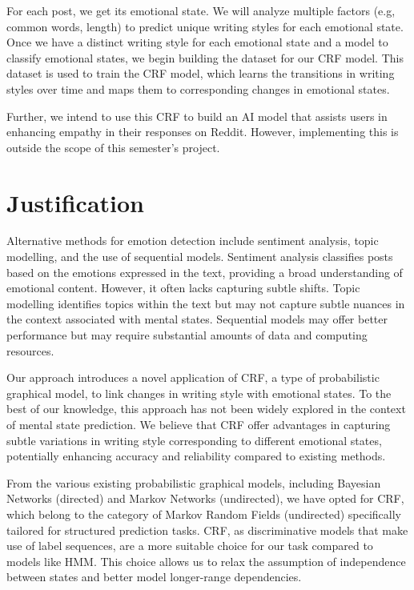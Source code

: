 \documentclass[conference,compsoc]{IEEEtran}
\begin{document}
For each post, we get its emotional state. We will analyze multiple factors (e.g, common words, length) to predict unique writing styles for each emotional state. Once we have a distinct writing style for each emotional state and a model to classify emotional states, we begin building the dataset for our CRF model. This dataset is used to train the CRF model, which learns the transitions in writing styles over time and maps them to corresponding changes in emotional states. 

Further, we intend to use this CRF to build an AI model that assists users in enhancing empathy in their responses on Reddit. However, implementing this is outside the scope of this semester's project. 


\section{Justification}
Alternative methods for emotion detection include sentiment analysis, topic modelling, and the use of sequential models. Sentiment analysis classifies posts based on the emotions expressed in the text, providing a broad understanding of emotional content. However, it often lacks capturing subtle shifts. Topic modelling identifies topics within the text but may not capture subtle nuances in the context associated with mental states. Sequential models may offer better performance but may require substantial amounts of data and computing resources.

Our approach introduces a novel application of CRF, a type of probabilistic graphical model, to link changes in writing style with emotional states. To the best of our knowledge, this approach has not been widely explored in the context of mental state prediction. We believe that CRF offer advantages in capturing subtle variations in writing style corresponding to different emotional states, potentially enhancing accuracy and reliability compared to existing methods.

From the various existing probabilistic graphical models, including Bayesian Networks (directed) and Markov Networks (undirected), we have opted for CRF, which belong to the category of Markov Random Fields (undirected) specifically tailored for structured prediction tasks. CRF, as discriminative models that make use of label sequences, are a more suitable choice for our task compared to models like HMM. This choice allows us to relax the assumption of independence between states and better model longer-range dependencies.
\end{document}
